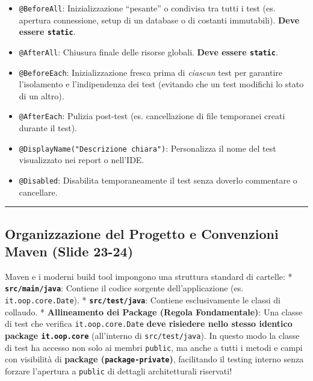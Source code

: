 \documentclass[11pt,a4paper,oneside]{report}
\newcommand{\passthrough}[1]{#1}
\providecommand{\tightlist}{\setlength{\itemsep}{0pt}\setlength{\parskip}{0pt}}
\begin{document}
\begin{itemize}
\tightlist
\item
  \passthrough{\lstinline!@BeforeAll!}: Inizializzazione ``pesante'' o
  condivisa tra tutti i test (es. apertura connessione, setup di un
  database o di costanti immutabili). \textbf{Deve essere
  \passthrough{\lstinline!static!}}.
\item
  \passthrough{\lstinline!@AfterAll!}: Chiusura finale delle risorse
  globali. \textbf{Deve essere \passthrough{\lstinline!static!}}.
\item
  \passthrough{\lstinline!@BeforeEach!}: Inizializzazione fresca prima
  di \emph{ciascun} test per garantire l'isolamento e l'indipendenza dei
  test (evitando che un test modifichi lo stato di un altro).
\item
  \passthrough{\lstinline!@AfterEach!}: Pulizia post-test (es.
  cancellazione di file temporanei creati durante il test).
\item
  \passthrough{\lstinline!@DisplayName("Descrizione chiara")!}:
  Personalizza il nome del test visualizzato nei report o nell'IDE.
\item
  \passthrough{\lstinline!@Disabled!}: Disabilita temporaneamente il
  test senza doverlo commentare o cancellare.
\end{itemize}

\begin{center}\rule{0.5\linewidth}{0.5pt}\end{center}

\subsection{Organizzazione del Progetto e Convenzioni Maven (Slide
23-24)}\label{chap18_organizzazione-del-progetto-e-convenzioni-maven-slide-23-24}

Maven e i moderni build tool impongono una struttura standard di
cartelle: * \textbf{\passthrough{\lstinline!src/main/java!}}: Contiene
il codice sorgente dell'applicazione (es.
\passthrough{\lstinline!it.oop.core.Date!}). *
\textbf{\passthrough{\lstinline!src/test/java!}}: Contiene
esclusivamente le classi di collaudo. * \textbf{Allineamento dei Package
(Regola Fondamentale)}: Una classe di test che verifica
\passthrough{\lstinline!it.oop.core.Date!} \textbf{deve risiedere nello
stesso identico package \passthrough{\lstinline!it.oop.core!}}
(all'interno di \passthrough{\lstinline!src/test/java!}). In questo modo
la classe di test ha accesso non solo ai membri
\passthrough{\lstinline!public!}, ma anche a tutti i metodi e campi con
visibilità di \textbf{package
(\passthrough{\lstinline!package-private!})}, facilitando il testing
interno senza forzare l'apertura a \passthrough{\lstinline!public!} di
dettagli architetturali riservati!
\end{document}
